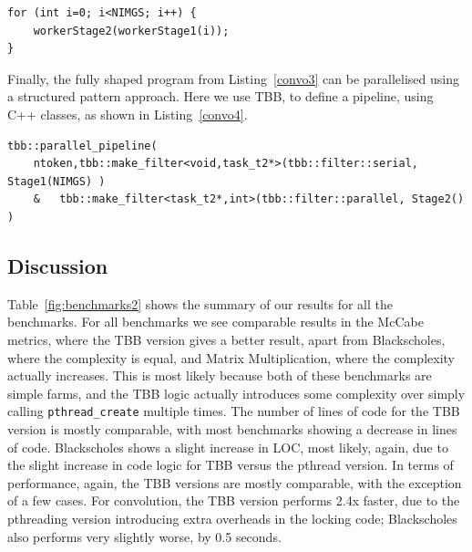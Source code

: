\begin{lstlisting}[label=convo3,caption={Convolution Shaped},frame=single]
for (int i=0; i<NIMGS; i++) {
	workerStage2(workerStage1(i));
}
\end{lstlisting}

Finally, the fully shaped program from Listing~\ref{convo3} can be parallelised using a structured pattern approach. Here we use TBB, to define a pipeline, using C++ classes, as shown in Listing~\ref{convo4}.


\begin{lstlisting}[label=convo4, caption={Convolution Restored with TBB},frame=single]
tbb::parallel_pipeline(
	ntoken,tbb::make_filter<void,task_t2*>(tbb::filter::serial, Stage1(NIMGS) )
	& 	tbb::make_filter<task_t2*,int>(tbb::filter::parallel, Stage2() )
\end{lstlisting}

\subsection{Discussion}

Table~\ref{fig:benchmarks2} shows the summary of our results for all the benchmarks. For all benchmarks we see comparable results in the McCabe metrics, where the TBB version gives a better result, apart from Blackscholes, where the complexity is equal, and Matrix Multiplication, where the complexity actually increases. This is most likely because both of these benchmarks are simple farms, and the TBB logic actually introduces some complexity over simply calling \lstinline{pthread_create} multiple times. The number of lines of code for the TBB version is mostly comparable, with most benchmarks showing a decrease in lines of code. Blackscholes shows a slight increase in LOC, most likely, again, due to the slight increase in code logic for TBB versus the pthread version. In terms of performance, again, the TBB versions are mostly comparable, with the exception of a few cases. For convolution, the TBB version performs 2.4x faster, due to the pthreading version introducing extra overheads in the locking code; Blackscholes also performs very slightly worse, by 0.5 seconds. 

